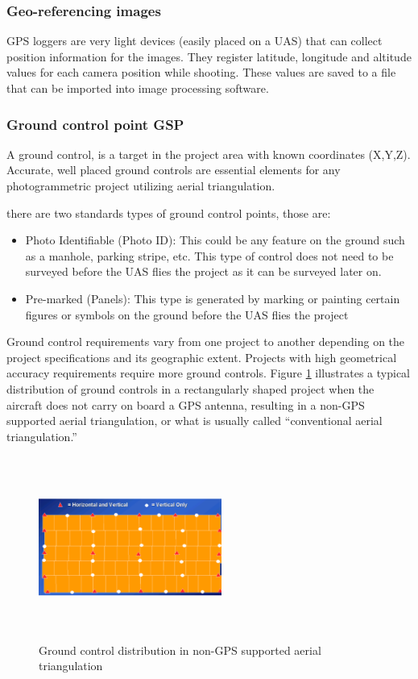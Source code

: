 \subsubsection{Geo-referencing images}
GPS loggers are very light devices (easily placed on a UAS) that can collect position information for the images. They register latitude, longitude and altitude values for each camera position while shooting. These values are saved to a file that can be imported into image processing software.\cite{GSDComputation}
\subsubsection{Ground control point GSP}
A ground control, is a target in the project area with known coordinates (X,Y,Z). Accurate, well placed ground controls are essential elements for any photogrammetric project utilizing aerial triangulation.\cite{Design_plann}

there are two standards types of ground control points, those are:
\begin{itemize}
\item Photo Identifiable (Photo ID): This could be any feature on the ground such as a manhole, parking stripe, etc. This type of control does not need to be surveyed before the UAS flies the project as it can be surveyed later on.\cite{Design_plann}
\item Pre-marked (Panels): This type is generated by marking or painting certain figures or symbols on the ground before the UAS flies the project \cite{Design_plann}
\end{itemize}
Ground control requirements vary from one project to another depending on the project specifications and its geographic extent. Projects with high geometrical accuracy requirements require more ground controls. Figure \ref{fig:GCP_sin} illustrates a typical distribution of ground controls in a rectangularly shaped project when the aircraft does not carry on board a GPS antenna, resulting in a non-GPS supported aerial triangulation, or what is usually called “conventional aerial triangulation.”\cite{GCP}
\begin{figure}[H]
\centering
\includegraphics[width=6cm,height=6cm,keepaspectratio]{imagenes/GCP_sin.PNG}
\caption{ Ground control distribution in non-GPS supported aerial triangulation }
\label{fig:GCP_sin}
\end{figure}
